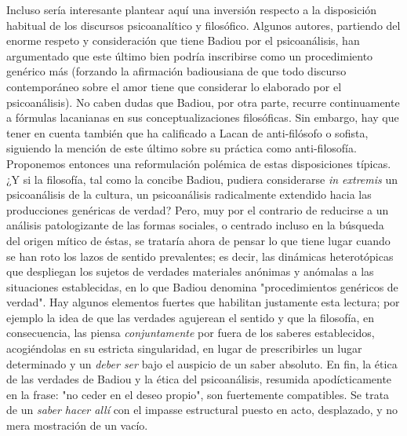 Incluso sería interesante plantear aquí una inversión respecto a la
disposición habitual de los discursos psicoanalítico y filosófico.
Algunos autores, partiendo del enorme respeto y consideración que tiene
Badiou por el psicoanálisis, han argumentado que este último bien podría
inscribirse como un procedimiento genérico más (forzando la afirmación
badiousiana de que todo discurso contemporáneo sobre el amor tiene que
considerar lo elaborado por el psicoanálisis). No caben dudas que
Badiou, por otra parte, recurre continuamente a fórmulas lacanianas en
sus conceptualizaciones filosóficas. Sin embargo, hay que tener en
cuenta también que ha calificado a Lacan de anti-filósofo o sofista,
siguiendo la mención de este último sobre su práctica como
anti-filosofía. Proponemos entonces una reformulación polémica de estas
disposiciones típicas. ¿Y si la filosofía, tal como la concibe Badiou,
pudiera considerarse \emph{in extremis} un psicoanálisis de la cultura,
un psicoanálisis radicalmente extendido hacia las producciones genéricas
de verdad? Pero, muy por el contrario de reducirse a un análisis
patologizante de las formas sociales, o centrado incluso en la búsqueda
del origen mítico de éstas, se trataría ahora de pensar lo que tiene
lugar cuando se han roto los lazos de sentido prevalentes; es decir, las
dinámicas heterotópicas que despliegan los sujetos de verdades
materiales anónimas y anómalas a las situaciones establecidas, en lo que
Badiou denomina "procedimientos genéricos de verdad". Hay algunos
elementos fuertes que habilitan justamente esta lectura; por ejemplo la
idea de que las verdades agujerean el sentido y que la filosofía, en
consecuencia, las piensa \emph{conjuntamente} por fuera de los saberes
establecidos, acogiéndolas en su estricta singularidad, en lugar de
prescribirles un lugar determinado y un \emph{deber ser} bajo el
auspicio de un saber absoluto. En fin, la ética de las verdades de
Badiou y la ética del psicoanálisis, resumida apodícticamente en la
frase: "no ceder en el deseo propio", son fuertemente compatibles. Se
trata de un \emph{saber hacer allí} con el impasse estructural puesto en
acto, desplazado, y no mera mostración de un vacío.

